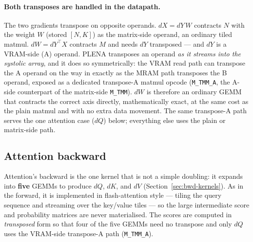 \documentclass[11pt]{report}
\begin{document}
\paragraph{Both transposes are handled in the datapath.} The two gradients
transpose on opposite operands. $dX = dY\,W$ contracts $N$ with the weight
$W$ (stored $[N,K]$) as the matrix-side operand, an ordinary tiled matmul.
$dW = dY^\top X$ contracts $M$ and needs $dY$ transposed --- and $dY$ is a
VRAM-side (A) operand. PLENA transposes an operand \emph{as it streams into
the systolic array}, and it does so symmetrically: the VRAM read path can
transpose the A operand on the way in exactly as the MRAM path transposes the
B operand, exposed as a dedicated transpose-A matmul opcode (\texttt{M\_TMM\_A},
the A-side counterpart of the matrix-side \texttt{M\_TMM}). $dW$ is therefore
an ordinary GEMM that contracts the correct axis directly, mathematically
exact, at the same cost as the plain matmul and with no extra data movement.
The same transpose-A path serves the one attention case ($dQ$) below;
everything else uses the plain or matrix-side path.

\subsection{Attention backward}

Attention's backward is the one kernel that is not a simple doubling: it
expands into \textbf{five} GEMMs to produce $dQ$, $dK$, and $dV$
(Section~\ref{sec:bwd-kernels}). As in the forward, it is implemented in
flash-attention style --- tiling the query sequence and streaming over the
key/value tiles --- so the large intermediate score and probability matrices
are never materialised. The scores are computed in \emph{transposed} form so
that four of the five GEMMs need no transpose and only $dQ$ uses the
VRAM-side transpose-A path (\texttt{M\_TMM\_A}).

\begin{algorithm}[H]
\DontPrintSemicolon
{}
\caption{Attention backward: two nested loops; $dQ$ streamed, $dK/dV$ accumulated}
\end{algorithm}
\end{document}
